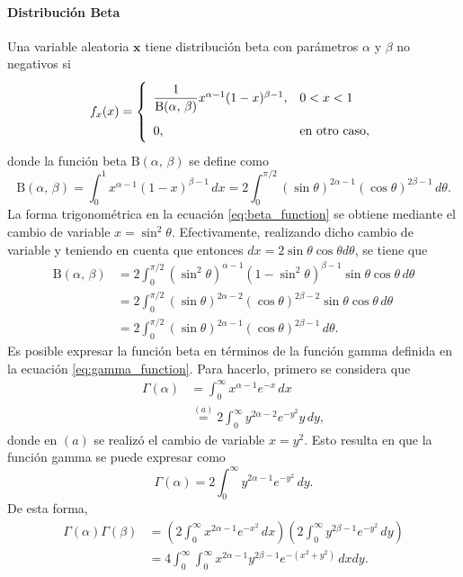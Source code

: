 \documentclass[a4paper]{report}
\newcommand{\x}{\mathbf{x}}
\begin{document}
\paragraph{Distribución Beta} Una variable aleatoria \(\x\) tiene distribución beta con parámetros \(\alpha\) y \(\beta\) no negativos  si
\begin{equation}\label{eq:pdf_beta}
\def\arraystretch{2.0}
 f_x(x)=
 \left\{\begin{array}{ll}
  \dfrac{1}{\mathrm{B}(\alpha,\,\beta)}x^{\alpha-1}(1-x)^{\beta-1}, & 0<x<1\\
  0, & \textrm{en otro caso},
 \end{array} \right.
\end{equation}
donde la función beta \(\mathrm{B}(\alpha,\,\beta)\) se define como
\begin{equation}\label{eq:beta_function}
 \mathrm{B}(\alpha,\,\beta)=\int_0^1x^{\alpha-1}(1-x)^{\beta-1}\,dx
  =2\int_0^{\pi/2}(\sin\theta)^{2\alpha-1}(\cos\theta)^{2\beta-1}\,d\theta.
\end{equation}
La forma trigonométrica en la ecuación \ref{eq:beta_function} se obtiene mediante el cambio de variable \(x=\sin^2\theta\). Efectivamente, realizando dicho cambio de variable y teniendo en cuenta que entonces \(dx=2\sin\theta\cos\theta d\theta\), se tiene que 
\begin{align*}
 \mathrm{B}(\alpha,\,\beta)&=2\int_0^{\pi/2}(\sin^2\theta)^{\alpha-1}(1-\sin^2\theta)^{\beta-1}\sin\theta\cos\theta\,d\theta\\
  &=2\int_0^{\pi/2}(\sin\theta)^{2\alpha-2}(\cos\theta)^{2\beta-2}\sin\theta\cos\theta\,d\theta\\
  &=2\int_0^{\pi/2}(\sin\theta)^{2\alpha-1}(\cos\theta)^{2\beta-1}\,d\theta.
\end{align*}
Es posible expresar la función beta en términos de la función gamma definida en la ecuación \ref{eq:gamma_function}. Para hacerlo, primero se considera que 
\begin{align*}
 \Gamma(\alpha)&=\int_{0}^{\infty}x^{\alpha-1}e^{-x}\,dx\\
   &\overset{(a)}{=}2\int_{0}^{\infty}y^{2\alpha-2}e^{-y^2}y\,dy,
\end{align*}
donde en \((a)\) se realizó el cambio de variable \(x=y^2\). Esto resulta en que la función gamma se puede expresar como
\[
 \Gamma(\alpha)=2\int_{0}^{\infty}y^{2\alpha-1}e^{-y^2}\,dy.
\]
De esta forma, 
\begin{align*}
 \Gamma(\alpha)\Gamma(\beta)&=\left(2\int_{0}^{\infty}x^{2\alpha-1}e^{-x^2}\,dx\right)\left(2\int_{0}^{\infty}y^{2\beta-1}e^{-y^2}\,dy\right)\\
  &=4\int_{0}^{\infty}\int_{0}^{\infty}x^{2\alpha-1}y^{2\beta-1}e^{-(x^2+y^2)}\,dxdy.
\end{align*}
\end{document}
